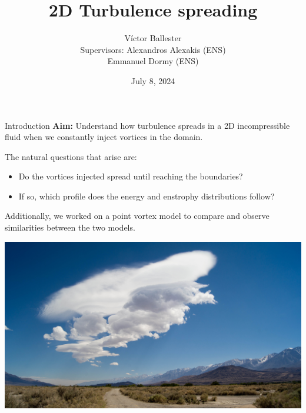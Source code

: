 \documentclass{beamer} %
\title{2D Turbulence spreading}
\author{
	Víctor Ballester\texorpdfstring{\vspace{0.45cm}\\}{}{\small Supervisors: Alexandros Alexakis (ENS)\texorpdfstring{\\}{}
\hspace{1.5cm} Emmanuel Dormy (ENS)}}
\date{July 8, 2024}
\begin{document}
\thispagestyle{empty}
\frame[noframenumbering]{\titlepage}
\setcounter{framenumber}{0}
\begin{frame}{Introduction}
	\textbf{Aim:} Understand how turbulence spreads in a 2D incompressible fluid when we constantly inject vortices in the domain.

	The natural questions that arise are:
	\begin{itemize}
		\item Do the vortices injected spread until reaching the boundaries?
		\item If so, which profile does the energy and enstrophy distributions follow?
	\end{itemize}

	\begin{minipage}{0.39\textwidth}
		Additionally, we worked on a \textcolor{\mycolorhighlight}{point vortex model} to compare and observe similarities between the two models.
	\end{minipage}\hspace{0.04\textwidth}
	\begin{minipage}{0.49\textwidth}
		\centering
		\includegraphics[width=\textwidth]{../images/athmosphere.jpg}
	\end{minipage}
\end{frame}
\end{document}
